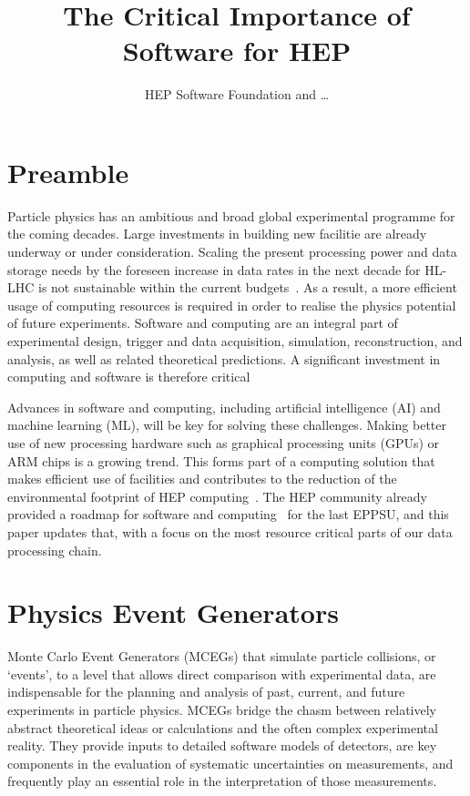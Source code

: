 \documentclass[10pt,a4paper]{article}
\begin{document}
\title{The Critical Importance of Software for HEP}

\author{HEP Software Foundation and \dots}

\maketitle

\section{Preamble}\label{preamble}

Particle physics has an ambitious and broad global experimental programme for
the coming decades. Large investments in building new facilitie are already
underway or under consideration. Scaling the present processing power and data
storage needs by the foreseen increase in data rates in the next decade for
HL-LHC is not sustainable within the current
budgets~\cite{CERN-LHCC-2022-005,Software:2815292}. As a result, a more
efficient usage of computing resources is required in order to realise the
physics potential of future experiments. Software and computing are an integral
part of experimental design, trigger and data acquisition, simulation,
reconstruction, and analysis, as well as related theoretical predictions. A
significant investment in computing and software is therefore critical

Advances in software and computing, including artificial intelligence (AI) and
machine learning (ML), will be key for solving these challenges. Making better
use of new processing hardware such as graphical processing units (GPUs) or ARM
chips is a growing trend. This forms part of a computing solution that makes
efficient use of facilities and contributes to the reduction of the
environmental footprint of HEP computing~\cite{wlcgsust}. The HEP community
already provided a roadmap for software and computing~\cite{hsfcwp} for the last
EPPSU, and this paper updates that, with a focus on the most resource critical
parts of our data processing chain.

\section{Physics Event Generators}\label{physics-event-generators}

Monte Carlo Event Generators (MCEGs) that simulate particle collisions,
or `events', to a level that allows direct comparison with
experimental data, are indispensable for the planning and analysis of
past, current, and future experiments in particle physics. MCEGs bridge
the chasm between relatively abstract theoretical ideas or calculations
and the often complex experimental reality. They provide inputs to
detailed software models of detectors, are key components in the
evaluation of systematic uncertainties on measurements, and frequently
play an essential role in the interpretation of those measurements.
\end{document}
